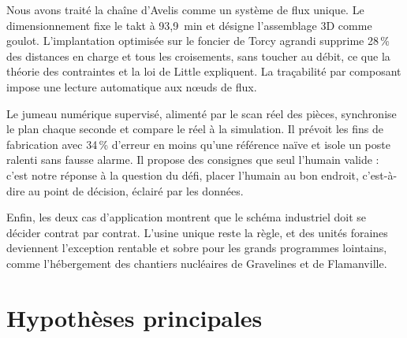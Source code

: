 \documentclass[11pt,a4paper]{article}
\begin{document}
Nous avons traité la chaîne d'Avelis comme un système de flux unique. Le dimensionnement fixe le
takt à 93,9~min et désigne l'assemblage 3D comme goulot. L'implantation optimisée sur le foncier
de Torcy agrandi supprime 28\,\% des distances en charge et tous les croisements, sans toucher au
débit, ce que la théorie des contraintes et la loi de Little expliquent. La traçabilité par
composant impose une lecture automatique aux nœuds de flux.

Le jumeau numérique supervisé, alimenté par le scan réel des pièces, synchronise le plan chaque
seconde et compare le réel à la simulation. Il prévoit les fins de fabrication avec 34\,\%
d'erreur en moins qu'une référence naïve et isole un poste ralenti sans fausse alarme. Il propose
des consignes que seul l'humain valide : c'est notre réponse à la question du défi, placer
l'humain au bon endroit, c'est-à-dire au point de décision, éclairé par les données.

Enfin, les deux cas d'application montrent que le schéma industriel doit se décider contrat par
contrat. L'usine unique reste la règle, et des unités foraines deviennent l'exception rentable et
sobre pour les grands programmes lointains, comme l'hébergement des chantiers nucléaires de
Gravelines et de Flamanville.

\printbibliography[heading=bibintoc,title={Références}]

\appendix
\section{Hypothèses principales}\label{ann:hypotheses}
\end{document}
